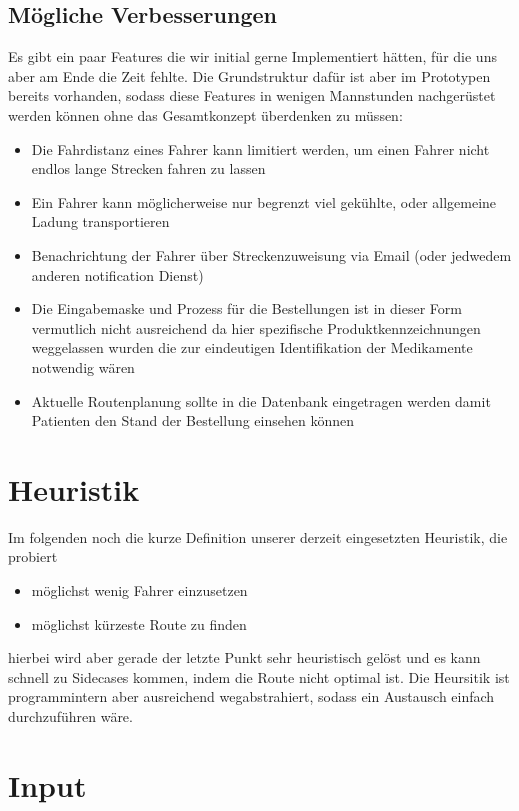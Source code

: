 \documentclass[a4]{article}
\begin{document}
\subsection{Mögliche Verbesserungen}

Es gibt ein paar Features die wir initial gerne Implementiert hätten, für die uns aber am Ende die Zeit fehlte. Die Grundstruktur dafür ist aber im Prototypen bereits vorhanden, sodass diese Features in wenigen
Mannstunden nachgerüstet werden können ohne das Gesamtkonzept überdenken zu müssen:

\begin{itemize}
\item Die Fahrdistanz eines Fahrer kann limitiert werden, um einen Fahrer nicht endlos lange Strecken fahren zu lassen
\item Ein Fahrer kann möglicherweise nur begrenzt viel gekühlte, oder allgemeine Ladung transportieren
\item Benachrichtung der Fahrer über Streckenzuweisung via Email (oder jedwedem anderen notification Dienst)
\item Die Eingabemaske und Prozess für die Bestellungen ist in dieser Form vermutlich nicht ausreichend da hier spezifische Produktkennzeichnungen weggelassen wurden die zur eindeutigen Identifikation der Medikamente notwendig wären
\item Aktuelle Routenplanung sollte in die Datenbank eingetragen werden damit Patienten den Stand der Bestellung einsehen können
\end{itemize}

\section{Heuristik}

Im folgenden noch die kurze Definition unserer derzeit eingesetzten Heuristik, die probiert

\begin{itemize}
\item möglichst wenig Fahrer einzusetzen
\item möglichst kürzeste Route zu finden
\end{itemize}

hierbei wird aber gerade der letzte Punkt sehr heuristisch gelöst und es kann schnell zu Sidecases kommen, indem die Route nicht optimal ist. Die Heursitik ist programmintern aber ausreichend wegabstrahiert, sodass ein Austausch einfach durchzuführen wäre.

\section{Input}
\end{document}
